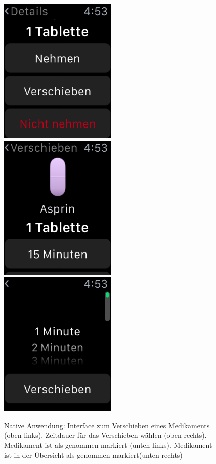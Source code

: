 \begin{figure}
	\caption{Native Anwendung: Interface zum Verschieben eines Medikaments (oben links). Zeitdauer für das Verschieben wählen (oben rechts). Medikament ist als genommen markiert (unten links). Medikament ist in der Übersicht als genommen markiert(unten rechts)}
	\label{fig:watch-app-delay}
	\includegraphics[width=0.5\textwidth]{04_realisation/screenshots/watch/delay01.png}
	\includegraphics[width=0.5\textwidth]{04_realisation/screenshots/watch/delay02.png}
	\includegraphics[width=0.5\textwidth]{04_realisation/screenshots/watch/delay03.png}

\end{figure}
